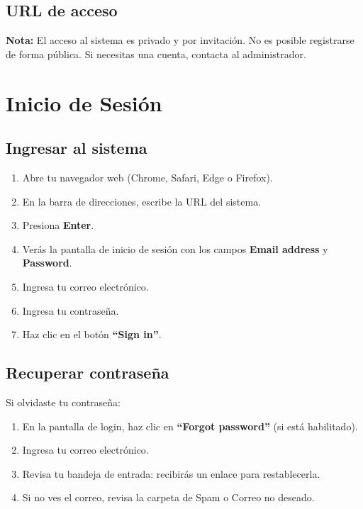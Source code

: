 \documentclass[12pt,oneside]{article}
\begin{document}
\subsection{URL de acceso}

\begin{center}
\end{center}

\noindent\textbf{Nota:} El acceso al sistema es privado y por invitación. No es posible registrarse de forma pública. Si necesitas una cuenta, contacta al administrador.

\section{Inicio de Sesión}

\subsection{Ingresar al sistema}

\begin{enumerate}[leftmargin=*]
  \item Abre tu navegador web (Chrome, Safari, Edge o Firefox).
  \item En la barra de direcciones, escribe la URL del sistema.
  \item Presiona \textbf{Enter}.
  \item Verás la pantalla de inicio de sesión con los campos \textbf{Email address} y \textbf{Password}.
  \item Ingresa tu correo electrónico.
  \item Ingresa tu contraseña.
  \item Haz clic en el botón \textbf{“Sign in”}.
\end{enumerate}

\subsection{Recuperar contraseña}

Si olvidaste tu contraseña:

\begin{enumerate}[leftmargin=*]
  \item En la pantalla de login, haz clic en \textbf{“Forgot password”} (si está habilitado).
  \item Ingresa tu correo electrónico.
  \item Revisa tu bandeja de entrada: recibirás un enlace para restablecerla.
  \item Si no ves el correo, revisa la carpeta de Spam o Correo no deseado.
\end{enumerate}
\end{document}
